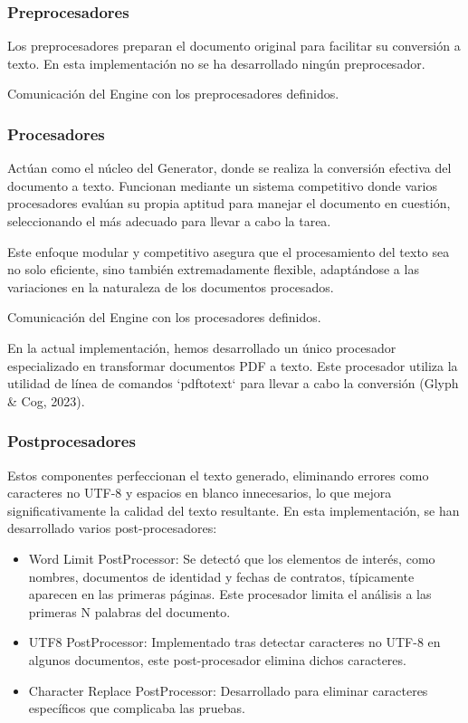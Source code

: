 \subsubsection*{Preprocesadores}
Los preprocesadores preparan el documento original para facilitar su conversión a texto.
En esta implementación no se ha desarrollado ningún preprocesador.

Comunicación del Engine con los preprocesadores definidos.


\subsubsection*{Procesadores}
Actúan como el núcleo del Generator, donde se realiza la conversión efectiva del documento a texto. Funcionan mediante
un sistema competitivo donde varios procesadores evalúan su propia aptitud para manejar el documento en cuestión,
seleccionando el más adecuado para llevar a cabo la tarea.

Este enfoque modular y competitivo asegura que el procesamiento del texto sea no solo eficiente, sino también
extremadamente flexible, adaptándose a las variaciones en la naturaleza de los documentos procesados.


Comunicación del Engine con los procesadores definidos.

En la actual implementación, hemos desarrollado un único procesador especializado en transformar documentos PDF a
texto. Este procesador utiliza la utilidad de línea de comandos `pdftotext` para llevar a cabo la conversión (Glyph \&
Cog, 2023).

\subsubsection*{Postprocesadores}
Estos componentes perfeccionan el texto generado, eliminando errores como caracteres no UTF-8 y espacios en blanco
innecesarios, lo que mejora significativamente la calidad del texto resultante. En esta implementación, se han
desarrollado varios post-procesadores:

\begin{itemize}
    \item
    Word Limit PostProcessor: Se detectó que los elementos de interés, como nombres, documentos de identidad y fechas de
    contratos, típicamente aparecen en las primeras páginas. Este procesador limita el análisis a las primeras N
    palabras del documento.
    \item UTF8 PostProcessor: Implementado tras detectar caracteres no UTF-8 en algunos documentos, este post-procesador
    elimina dichos caracteres.
    \item Character Replace PostProcessor: Desarrollado para eliminar caracteres específicos que complicaba las pruebas.
\end{itemize}

